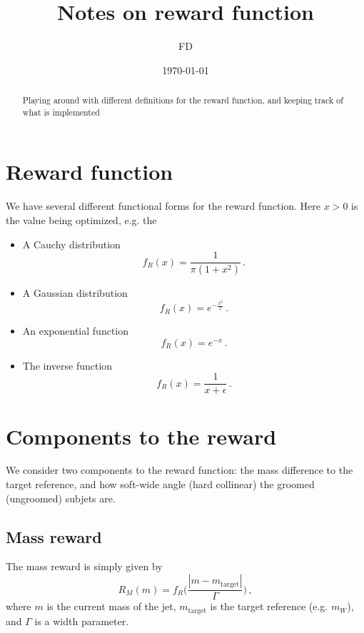 \documentclass[12pt,twoside]{article}
\begin{document}
\title{Notes on reward function}
\date{\today}
\author{FD}
\maketitle
\begin{abstract}
  Playing around with different definitions for the reward function,
  and keeping track of what is implemented
\end{abstract}


\section{Reward function}
We have several different functional forms for the reward function.
Here $x>0$ is the value being optimized, e.g. the
\begin{itemize}
\item A Cauchy distribution
  \begin{equation}
    \label{eq:cauchy-reward}
    f_R(x) = \frac{1}{\pi(1 + x^2)}\,.
  \end{equation}
\item A Gaussian distribution
  \begin{equation}
    \label{eq:gauss-reward}
    f_R(x) = e^{-\tfrac{x^2}{2}}\,.
  \end{equation}
\item An exponential function
  \begin{equation}
    \label{eq:exp-reward}
    f_R(x) = e^{-x}\,.
  \end{equation}
\item The inverse function
  \begin{equation}
    \label{eq:inv-reward}
    f_R(x) = \frac{1}{x+\epsilon}\,.
  \end{equation}
\end{itemize}

\section{Components to the reward}
We consider two components to the reward function: the mass difference
to the target reference, and how soft-wide angle (hard collinear) the
groomed (ungroomed) subjets are.

\subsection{Mass reward}
The mass reward is simply given by
\begin{equation}
  \label{eq:mass-reward}
  R_M(m) = f_R\Big(\frac{|m - m_\text{target}|}{\Gamma}\Big)\,,
\end{equation}
where $m$ is the current mass of the jet, $m_\text{target}$ is the
target reference (e.g. $m_W$), and $\Gamma$ is a width parameter.
\end{document}
